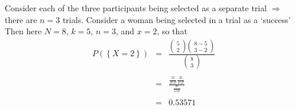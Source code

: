 \documentclass[smaller, handout]{beamer}\usepackage[]{graphicx}\usepackage[]{color}
\renewcommand{\Pr}{P}
\begin{document}
\begin{frame}{\secname}%


\begin{example}[cont'd]
Consider each of the three participants being selected as a separate
trial $\Rightarrow $ there are $n=3$ trials. Consider a woman being selected in a trial as a `success'
\\
Then here $N=8$, $k=5$, $n=3$, and $x=2$, so that%
\begin{eqnarray*}
\Pr (\left\{ X=2\right\})  &=&\frac{\left(
\begin{array}{c}
5 \\
2%
\end{array}%
\right) \left(
\begin{array}{c}
8-5 \\
3-2%
\end{array}%
\right) }{\left(
\begin{array}{c}
8 \\
3%
\end{array}%
\right) } \\
&& \\
&=&\frac{\frac{5!}{2!3!}\frac{3!}{1!2!}}{\frac{8!}{5!3!}} \\
&& \\
&=&0.53571
\end{eqnarray*}
\end{example}

\end{frame}%
\end{document}
